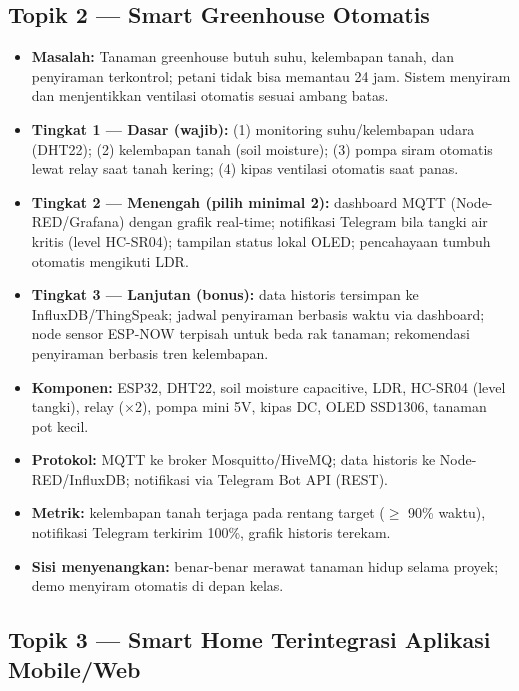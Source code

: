 \documentclass[11pt,a4paper]{article}
\begin{document}
\subsection*{Topik 2 --- Smart Greenhouse Otomatis}

\begin{itemize}
  \item \textbf{Masalah:} Tanaman greenhouse butuh suhu, kelembapan tanah, dan
        penyiraman terkontrol; petani tidak bisa memantau 24 jam. Sistem
        menyiram dan menjentikkan ventilasi otomatis sesuai ambang batas.
  \item \textbf{Tingkat 1 --- Dasar (wajib):} (1) monitoring suhu/kelembapan
        udara (DHT22); (2) kelembapan tanah (soil moisture); (3) pompa siram
        otomatis lewat relay saat tanah kering; (4) kipas ventilasi otomatis
        saat panas.
  \item \textbf{Tingkat 2 --- Menengah (pilih minimal 2):} dashboard MQTT
        (Node-RED/Grafana) dengan grafik real-time; notifikasi Telegram bila
        tangki air kritis (level HC-SR04); tampilan status lokal OLED;
        pencahayaan tumbuh otomatis mengikuti LDR.
  \item \textbf{Tingkat 3 --- Lanjutan (bonus):} data historis tersimpan ke
        InfluxDB/ThingSpeak; jadwal penyiraman berbasis waktu via dashboard;
        node sensor ESP-NOW terpisah untuk beda rak tanaman; rekomendasi
        penyiraman berbasis tren kelembapan.
  \item \textbf{Komponen:} ESP32, DHT22, soil moisture capacitive, LDR,
        HC-SR04 (level tangki), relay ($\times$2), pompa mini 5V, kipas DC,
        OLED SSD1306, tanaman pot kecil.
  \item \textbf{Protokol:} MQTT ke broker Mosquitto/HiveMQ; data historis ke
        Node-RED/InfluxDB; notifikasi via Telegram Bot API (REST).
  \item \textbf{Metrik:} kelembapan tanah terjaga pada rentang target
        ($\geq$ 90\% waktu), notifikasi Telegram terkirim 100\%, grafik
        historis terekam.
  \item \textbf{Sisi menyenangkan:} benar-benar merawat tanaman hidup selama
        proyek; demo menyiram otomatis di depan kelas.
\end{itemize}

\subsection*{Topik 3 --- Smart Home Terintegrasi Aplikasi Mobile/Web}
\end{document}
